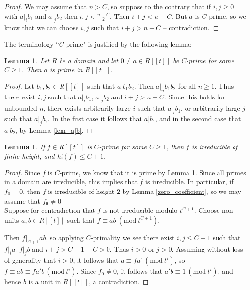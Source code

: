 \documentclass{article}
\newcommand{\Mod}[1]{\ (\mathrm{mod}\ #1)}
\theoremstyle{plain}
\newtheorem{lemma}[theorem]{Lemma}
\theoremstyle{definition}
\theoremstyle{remark}
\theoremstyle{plain}
\begin{document}
\begin{proof}

We may assume that $n>C$, so suppose to the contrary that if $i,j\geq 0$ with $a|_ib_1$ and $a|_jb_2$ then $i,j<\frac{n-C}{2}$. Then $i+j<n-C$. But $a$ is $C$-prime, so we know that we can choose $i,j$ such that $i+j>n-C$ -- contradiction.\end{proof}

The terminology ``$C$-prime" is justified by the following lemma:

\begin{lemma}\label{C-prime means prime} Let $R$ be a domain and let $0 \neq a \in R[[t]]$ be $C$-prime for some $C \geq 1$. Then $a$ is prime in $R[[t]]$.
    
\end{lemma}
\begin{proof}
    Let $b_1,b_2 \in R[[t]]$ such that $a|b_1b_2$. Then $a|_nb_1b_2$ for all $n \geq 1$. Thus there exist $i,j$ such that $a|_ib_1$, $a|_jb_2$ and $i+j> n-C$. Since this holds for unbounded $n$, there exists arbitrarily large $i$ such that $a|_i b_1$, or arbitrarily large $j$ such that $a|_j b_2$. In the first case it follows that $a|b_1$, and in the second case that $a|b_2$, by Lemma \ref{lem_a|b}.
\end{proof}

\begin{lemma}\label{prime implies irreducible (finite height)}
If $f\in R[[t]]$ is $C$-prime for some $C\geq 1$, then $f$ is irreducible of finite height, and \emph{ht}$(f)\leq C+1$.
\end{lemma}

\begin{proof}

Since $f$ is $C$-prime, we know that it is prime by Lemma \ref{C-prime means prime}. Since all primes in a domain are irreducible, this implies that $f$ is irreducible. In particular, if $f_0= 0$, then $f$ is irreducible of height 2 by Lemma \ref{zero_coefficient}, so we may assume that $f_0\neq 0$.\\

\noindent Suppose for contradiction that $f$ is not irreducible modulo $t^{C+1}$. Choose non-units $a,b\in R[[t]]$ such that $f\equiv ab\Mod{t^{C+1}}$.

Then $f|_{C+1}ab$, so applying $C$-primality we see there exist $i,j\leq C+1$ such that $f|_ia$, $f|_jb$ and $i+j>C+1-C>0$. Thus $i>0$ or $j>0$. Assuming without loss of generality that $i>0$, it follows that $a\equiv fa'\Mod{t^i}$, so $f\equiv ab\equiv fa'b\Mod{t^i}$. Since $f_0\neq 0$, it follows that $a'b\equiv 1\Mod{t^i}$, and hence $b$ is a unit in $R[[t]]$, a contradiction.\end{proof}
\end{document}
